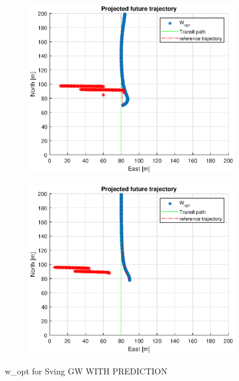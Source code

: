 \begin{figure}
\begin{subfigure}[b]{0.499\textwidth}
    \end{subfigure}
    \hfill
    \\
    \begin{subfigure}[b]{0.49\textwidth}
        \centering
        \includegraphics[width=\textwidth]{Images/Figures/sving_GW/simple0_f999_frame5}
    \end{subfigure}
    \hfill
    \begin{subfigure}[b]{0.49\textwidth}
        \centering
        \includegraphics[width=\textwidth]{Images/Figures/sving_GW/simple0_f999_frame6}
    \end{subfigure}
    \caption{w\_opt for Sving GW WITH PREDICTION}
\end{figure} 


